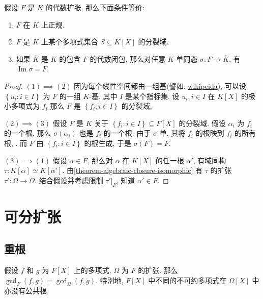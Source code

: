 \begin{theorem}
  \label{theorem-normal-extension-TFAE-conditions}
  假设 \( F \) 是 \( K \) 的代数扩张, 那么下面条件等价:
  \begin{enumerate}
    \item \( F \) 在 \( K \) 上正规.
    \item \( F \) 是 \( K \) 上某个多项式集合 \( S \subseteq K[X] \) 的分裂域.
    \item 如果 \( \overline{K} \) 是 \( K \) 的包含 \( F \) 的代数闭包,
      那么对任意 \( K \)-单同态 \( \sigma: F \to \overline{K} \), 有 \(
      \operatorname{Im} \sigma = F \).
  \end{enumerate}
\end{theorem}
\begin{proof}
  \( (1) \implies (2) \)
  因为每个线性空间都由一组基(譬如:
  \href{https://en.wikipedia.org/wiki/Basis_(linear_algebra)#Proof_that_every_vector_space_has_a_basis}{wikipeida}),
  可以设 \( \left\lbrace u_i: i \in I \right\rbrace \) 为 \( F \) 的一组 \( K
  \)-基, 其中 \( I \) 是某个指标集.
  设 \( u_i, i \in I \) 在 \( K[X] \) 的极小多项式为 \( f_i \) 那么 \( F \) 是
  \( \left\lbrace f_i: i \in I \right\rbrace \) 的分裂域.

  \( (2) \implies (3) \)
  假设 \( F \) 是 \( K \) 关于 \( \left\lbrace f_i: i \in I\right\rbrace
  \subseteq F[X] \) 的分裂域.
  假设 \( \alpha_i \) 为 \( f_i \) 的一个根, 那么 \( \sigma(\alpha_i) \) 也是 \(
  f_i \) 的一个根.
  由于 \( \sigma\) 单, 其将 \( f_i \) 的根映到 \( f_i \) 的所有根, .
  而 \( F \) 由 \( \left\lbrace f_i: i \in I \right\rbrace \) 的根生成, 于是 \(
  \sigma(F) = F \).

  \( (3) \implies (1) \)
  假设 \( \alpha \in F \), 那么对 \( \alpha \) 在 \( K[X] \) 的任一根 \( \alpha'
  \), 有域同构\( \tau: K[\alpha] \simeq K[\alpha'] \).
  由\cref{theorem-algebraic-closure-isomorphic} 有 \( \tau \) 的扩张 \( \tau':
  \Omega \to \Omega \).
  结合假设并考虑限制 \( \left. \tau' \right\vert_{F} \), 知道 \( \alpha' \in F
    \).
\end{proof}

\section{可分扩张}

\subsection{重根}

\begin{proposition}
  假设 \( f \) 和 \( g \) 为 \( F[X] \) 上的多项式, \( \Omega \) 为 \( F \)
  的扩张.
  那么 \( \gcd_F(f, g) = \gcd_{\Omega}(f, g) \).
  特别地, \( F[X] \) 中不同的不可约多项式在 \( \Omega[X] \) 中亦没有公共根.
\end{proposition}

